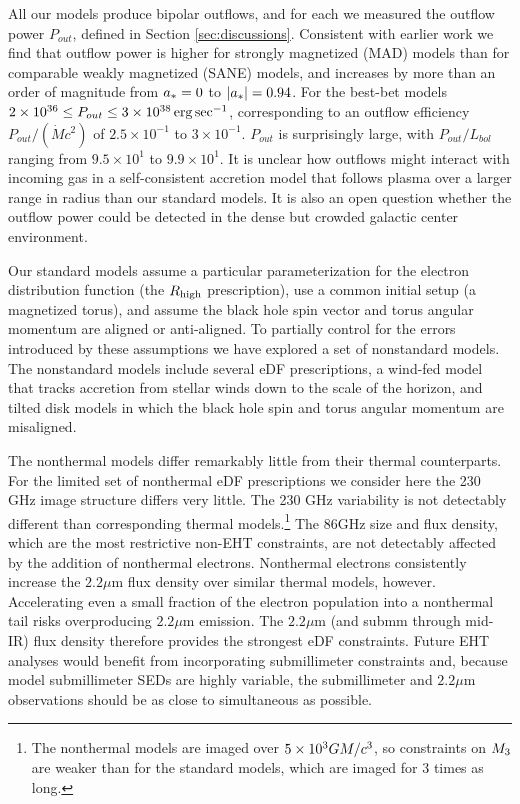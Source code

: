 All our models produce bipolar outflows, and for each we measured the outflow power $P_{out}$, defined in Section \ref{sec:discussions}. Consistent with earlier work we find that outflow power is higher for strongly magnetized (MAD) models than for comparable weakly magnetized (SANE) models, and increases by more than an order of magnitude from $a_* = 0$ to $|a_*| = 0.94$.  For the best-bet models $2 \times 10^{36} \le P_{out} \le 3 \times 10^{38} \,\mathrm{erg} \,\mathrm{sec}^{-1}$, corresponding to an outflow efficiency $P_{out}/(\dot{M} c^2)$ of $2.5\times10^{-1}$ to $3\times10^{-1}$.  $P_{out}$ is surprisingly large, with $P_{out}/L_{bol}$ ranging from $9.5\times10^{1}$ to $9.9\times10^{1}$.  It is unclear how outflows might interact with incoming gas in a self-consistent accretion model that follows plasma over a larger range in radius than our standard models.  It is also an open question whether the outflow power could be detected in the dense but crowded galactic center environment.

Our standard models assume a particular parameterization for the electron distribution function (the $R_\mathrm{high}$ prescription), use a common initial setup (a magnetized torus), and assume the black hole spin vector and torus angular momentum are aligned or anti-aligned.  To partially control for the errors introduced by these assumptions we have explored a set of nonstandard models.  The nonstandard models include several eDF prescriptions, a wind-fed model that tracks accretion from stellar winds down to the scale of the horizon, and tilted disk models in which the black hole spin and torus angular momentum are misaligned.

The nonthermal models differ remarkably little from their thermal counterparts.  For the limited set of nonthermal eDF prescriptions we consider here the 230 GHz image structure differs very little.  The 230 GHz variability is not detectably different than corresponding thermal models.\footnote{The nonthermal models are imaged over $5\times 10^3GM/c^3$, so constraints on $M_{3}$ are weaker than for the standard models, which are imaged for 3 times as long.} The 86GHz size and flux density, which are the most restrictive non-EHT constraints, are not detectably affected by the addition of nonthermal electrons.  Nonthermal electrons consistently increase the $2.2\mu$m flux density over similar thermal models, however.  Accelerating even a small fraction of the electron population into a nonthermal tail risks overproducing $2.2\mu$m emission.  The $2.2\mu$m (and submm through mid-IR) flux density therefore provides the strongest eDF constraints.  Future EHT analyses would benefit from incorporating submillimeter constraints \citep[e.g.]{2019ApJ...881L...2B} and, because model submillimeter SEDs are highly variable, the submillimeter and $2.2\mu$m observations should be as close to simultaneous as possible.

